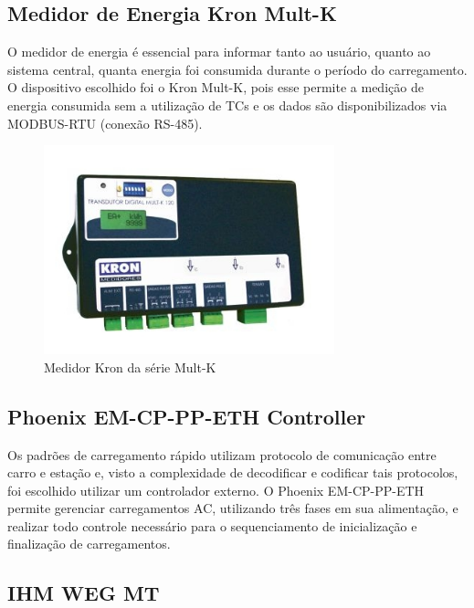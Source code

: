 \subsection{Medidor de Energia Kron Mult-K}

O medidor de energia é essencial para informar tanto ao usuário, quanto ao sistema central, quanta energia foi consumida durante o período do carregamento. O dispositivo escolhido foi o Kron Mult-K, pois esse permite a medição de energia consumida sem a utilização de TCs e os dados são disponibilizados via MODBUS-RTU (conexão RS-485).

\begin{figure}[H]
        \begin{center}
                \includegraphics[width=0.75\textwidth,natwidth=400,natheight=288]{assets/images/devices-kron.jpg}
                \caption{Medidor Kron da série Mult-K}
                \label{fig:kron}
        \end{center}
\end{figure}

\subsection{Phoenix EM-CP-PP-ETH Controller}

Os padrões de carregamento rápido utilizam protocolo de comunicação entre carro e estação e, visto a complexidade de decodificar e codificar tais protocolos, foi escolhido utilizar um controlador externo. O Phoenix EM-CP-PP-ETH permite gerenciar carregamentos AC, utilizando três fases em sua alimentação, e realizar todo controle necessário para o sequenciamento de inicialização e finalização de carregamentos.

\subsection{IHM WEG MT}

